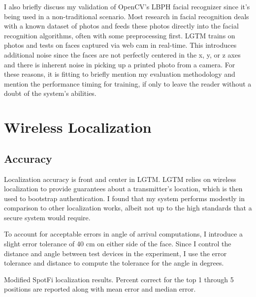 \documentclass[12pt]{report}
\begin{document}
I also briefly discuss my validation of OpenCV's LBPH facial recognizer since it's being used in a non-traditional scenario. Most research in facial recognition deals with a known dataset of photos and feeds these photos directly into the facial recognition algorithms, often with some preprocessing first. LGTM trains on photos and tests on faces captured via web cam in real-time. This introduces additional noise since the faces are not perfectly centered in the x, y, or z axes and there is inherent noise in picking up a printed photo from a camera. For these reasons, it is fitting to briefly mention my evaluation methodology and mention the performance timing for training, if only to leave the reader without a doubt of the system's abilities. \par

\section{Wireless Localization}
\subsection{Accuracy}
Localization accuracy is front and center in LGTM. LGTM relies on wireless localization to provide guarantees about a transmitter's location, which is then used to bootstrap authentication. I found that my system performs modestly in comparison to other localization works, albeit not up to the high standards that a secure system would require. \par

To account for acceptable errors in angle of arrival computations, I introduce a slight error tolerance of 40 cm on either side of the face. Since I control the distance and angle between test devices in the experiment, I use the error tolerance and distance to compute the tolerance for the angle in degrees. \par

\begin{table}
    \begin{center}
        \caption{Modified SpotFi localization results. Percent correct for the top 1 through 5 positions are reported along with mean error and median error.}
        \label{table: base-data-table}
                
    \end{center}
\end{table}
\end{document}
